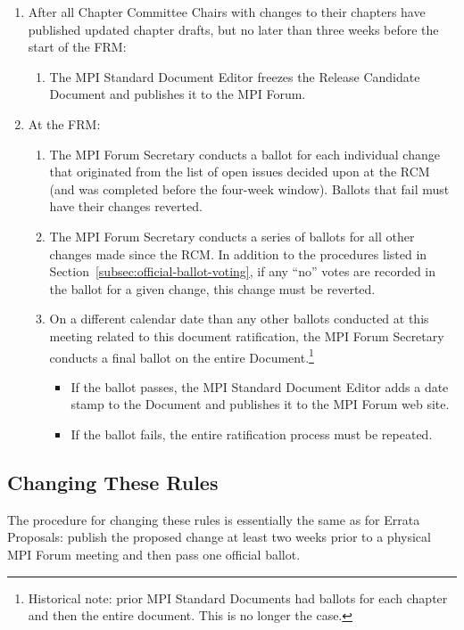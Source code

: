 {{\begin{enumerate}
\item After all Chapter Committee Chairs with changes to their
  chapters have published updated chapter drafts, but no later than
  three weeks before the start of the FRM:
  \begin{enumerate}
  \item The MPI Standard Document Editor freezes the Release Candidate
    Document and publishes it to the MPI Forum.
  \end{enumerate}

\item At the FRM:
  \begin{enumerate}
  \item The MPI Forum Secretary conducts a ballot for each individual
    change that originated from the list of open issues decided upon
    at the RCM (and was completed before the four-week window).
    Ballots that fail must have their changes reverted.
  \item The MPI Forum Secretary conducts a series of ballots for all
    other changes made since the RCM.  In addition to the procedures
    listed in Section~\ref{subsec:official-ballot-voting}, if any
    ``no'' votes are recorded in the ballot for a given change, this
    change must be reverted.
  \item On a different calendar date than any other ballots conducted
    at this meeting related to this document ratification, the MPI
    Forum Secretary conducts a final ballot on the entire
    Document.\footnote{Historical note: prior MPI Standard Documents
      had ballots for each chapter and then the entire document.  This
      is no longer the case.}
    \begin{itemize}
    \item If the ballot passes, the MPI Standard Document Editor adds
      a date stamp to the Document and publishes it to the MPI Forum
      web site.
    \item If the ballot fails, the entire ratification process must be
      repeated.
    \end{itemize}
   \end{enumerate}
\end{enumerate}

}} %


\subsection{Changing These Rules}

The procedure for changing these rules is essentially the same as for
Errata Proposals: publish the proposed change at least two weeks prior
to a physical MPI Forum meeting and then pass one official ballot.

{\color{red}{The new rules take effect as soon as they are
  approved/voted in by the MPI Forum.}}

